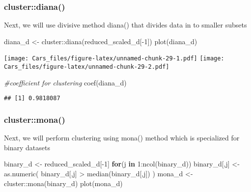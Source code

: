 \documentclass[
]{article}
\newenvironment{Shaded}{\begin{snugshade}}{\end{snugshade}}
\newcommand{\CommentTok}[1]{\textcolor[rgb]{0.56,0.35,0.01}{\textit{#1}}}
\newcommand{\ControlFlowTok}[1]{\textcolor[rgb]{0.13,0.29,0.53}{\textbf{#1}}}
\newcommand{\DecValTok}[1]{\textcolor[rgb]{0.00,0.00,0.81}{#1}}
\newcommand{\FunctionTok}[1]{\textcolor[rgb]{0.00,0.00,0.00}{#1}}
\newcommand{\NormalTok}[1]{#1}
\newcommand{\OtherTok}[1]{\textcolor[rgb]{0.56,0.35,0.01}{#1}}
\newcommand{\SpecialCharTok}[1]{\textcolor[rgb]{0.00,0.00,0.00}{#1}}
\begin{document}
\hypertarget{clusterdiana}{%
\subsubsection{cluster::diana()}\label{clusterdiana}}

Next, we will use divisive method diana() that divides data in to
smaller subsets

\begin{Shaded}
\begin{Highlighting}[]
\NormalTok{diana\_d }\OtherTok{\textless{}{-}}\NormalTok{ cluster}\SpecialCharTok{::}\FunctionTok{diana}\NormalTok{(reduced\_scaled\_d[}\SpecialCharTok{{-}}\DecValTok{1}\NormalTok{])}
\FunctionTok{plot}\NormalTok{(diana\_d)}
\end{Highlighting}
\end{Shaded}

\texttt{[image: Cars\_files/figure-latex/unnamed-chunk-29-1.pdf]}
\texttt{[image: Cars\_files/figure-latex/unnamed-chunk-29-2.pdf]}

\begin{Shaded}
\begin{Highlighting}[]
\CommentTok{\#coefficient for clustering}
\FunctionTok{coef}\NormalTok{(diana\_d)}
\end{Highlighting}
\end{Shaded}

\begin{verbatim}
## [1] 0.9818087
\end{verbatim}

\hypertarget{clustermona}{%
\subsubsection{cluster::mona()}\label{clustermona}}

Next, we will perform clustering using mona() method which is
specialized for binary datasets

\begin{Shaded}
\begin{Highlighting}[]
\NormalTok{binary\_d }\OtherTok{\textless{}{-}}\NormalTok{ reduced\_scaled\_d[}\SpecialCharTok{{-}}\DecValTok{1}\NormalTok{]}
\ControlFlowTok{for}\NormalTok{(j }\ControlFlowTok{in} \DecValTok{1}\SpecialCharTok{:}\FunctionTok{ncol}\NormalTok{(binary\_d)) binary\_d[,j] }\OtherTok{\textless{}{-}} \FunctionTok{as.numeric}\NormalTok{(}
\NormalTok{  binary\_d[,j] }\SpecialCharTok{\textgreater{}} \FunctionTok{median}\NormalTok{(binary\_d[,j])}
\NormalTok{)}
\NormalTok{mona\_d }\OtherTok{\textless{}{-}}\NormalTok{ cluster}\SpecialCharTok{::}\FunctionTok{mona}\NormalTok{(binary\_d)}
\FunctionTok{plot}\NormalTok{(mona\_d)}
\end{Highlighting}
\end{Shaded}
\end{document}
